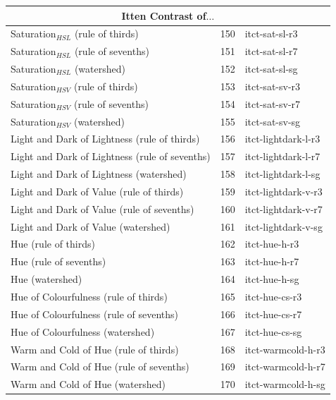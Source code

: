 \documentclass[11pt,a4paper,twoside,openright]{report}
\begin{document}
\begin{center}
\begin{longtable}{|l|c|l|}
\midrule
\multicolumn{3}{c}{Itten Contrast of$\ldots$} \\
\midrule
Saturation$_{HSL}$ (rule of thirds)              & 150 & itct-sat-sl-r3      \\
Saturation$_{HSL}$ (rule of sevenths)            & 151 & itct-sat-sl-r7      \\
Saturation$_{HSL}$ (watershed)                   & 152 & itct-sat-sl-sg      \\
Saturation$_{HSV}$ (rule of thirds)              & 153 & itct-sat-sv-r3      \\
Saturation$_{HSV}$ (rule of sevenths)            & 154 & itct-sat-sv-r7      \\
Saturation$_{HSV}$ (watershed)                   & 155 & itct-sat-sv-sg      \\
Light and Dark of Lightness (rule of thirds)     & 156 & itct-lightdark-l-r3 \\
Light and Dark of Lightness (rule of sevenths)   & 157 & itct-lightdark-l-r7 \\
Light and Dark of Lightness (watershed)          & 158 & itct-lightdark-l-sg \\
Light and Dark of Value (rule of thirds)         & 159 & itct-lightdark-v-r3 \\
Light and Dark of Value (rule of sevenths)       & 160 & itct-lightdark-v-r7 \\
Light and Dark of Value (watershed)              & 161 & itct-lightdark-v-sg \\
Hue (rule of thirds)                             & 162 & itct-hue-h-r3       \\
Hue (rule of sevenths)                           & 163 & itct-hue-h-r7       \\
Hue (watershed)                                  & 164 & itct-hue-h-sg       \\
Hue of Colourfulness (rule of thirds)            & 165 & itct-hue-cs-r3      \\
Hue of Colourfulness (rule of sevenths)          & 166 & itct-hue-cs-r7      \\
Hue of Colourfulness (watershed)                 & 167 & itct-hue-cs-sg      \\
Warm and Cold of Hue (rule of thirds)            & 168 & itct-warmcold-h-r3  \\
Warm and Cold of Hue (rule of sevenths)          & 169 & itct-warmcold-h-r7  \\
Warm and Cold of Hue (watershed)                 & 170 & itct-warmcold-h-sg  \\

\end{longtable}
\end{center}
\end{document}
